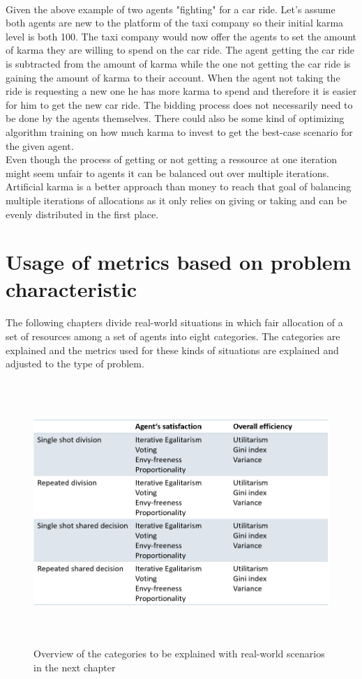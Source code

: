 \documentclass[german, a4paper, 11pt, oneside]{scrbook}
\begin{document}
\\Given the above example of two agents "fighting" for a car ride. Let's assume both agents are new to the platform of the taxi company so their initial karma level is both 100. The taxi company would now offer the agents to set the amount of karma they are willing to spend on the car ride. The agent getting the car ride is subtracted from the amount of karma while the one not getting the car ride is gaining the amount of karma to their account. When the agent not taking the ride is requesting a new one he has more karma to spend and therefore it is easier for him to get the new car ride. The bidding process does not necessarily need to be done by the agents themselves. There could also be some kind of optimizing algorithm training on how much karma to invest to get the best-case scenario for the given agent.
\\Even though the process of getting or not getting a ressource at one iteration might seem unfair to agents it can be balanced out over multiple iterations. Artificial karma is a better approach than money to reach that goal of balancing multiple iterations of allocations as it only relies on giving or taking and can be evenly distributed in the first place.
\chapter{Usage of metrics based on problem characteristic}
The following chapters divide real-world situations in which fair allocation of a set of resources among a set of agents into eight categories. The categories are explained and the metrics used for these kinds of situations are explained and adjusted to the type of problem.
\begin{figure}[h]
\centering
\includegraphics[height=10cm]{Categories}
\caption{Overview of the categories to be explained with real-world scenarios in the next chapter}
\end{figure}
\end{document}
